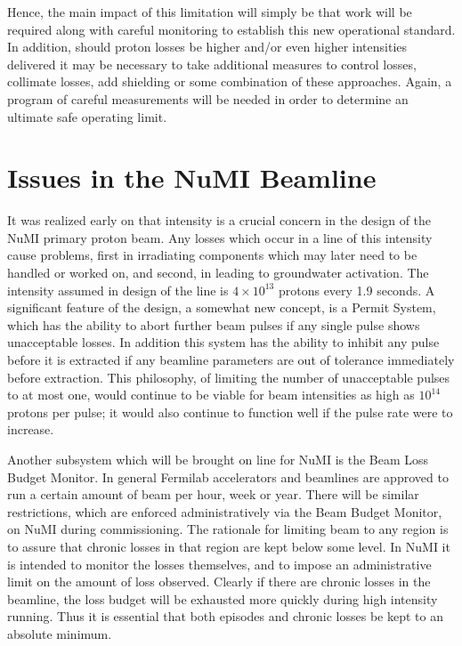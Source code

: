 \documentclass{article}
\begin{document}
Hence, the main impact of this limitation will simply be that 
work will be required along with careful monitoring to establish this new
operational standard. In addition, should proton losses be higher and/or
even higher intensities delivered it may be necessary to take additional
measures to control losses, collimate losses, add shielding or some
combination of these approaches. Again, a program of careful measurements
will be needed in order to determine an ultimate safe operating limit.

\section{Issues in the NuMI Beamline}

It was realized early on that intensity is a crucial concern
in the design 
of the NuMI primary proton beam. Any losses which occur in a line of this 
intensity cause problems, first in irradiating components which may later need 
to be handled or worked on, and second, in leading to groundwater activation. 
The intensity assumed in design of the line is 
$4 \times 10^{13}$ protons every 1.9 
seconds. A significant feature of the design, a somewhat new concept, is a 
Permit System, which has the ability to abort further beam pulses
if any single pulse shows unacceptable losses. 
In addition this system has the ability to inhibit any 
pulse before it is extracted
if any beamline parameters are out of tolerance 
immediately before extraction. This philosophy, of limiting the number of 
unacceptable pulses to at most one, would continue to be viable for beam 
intensities as high as $10^{14}$
 protons per pulse; it would also continue to function 
well if the pulse rate were to increase.

Another subsystem which will be brought on line for NuMI is the Beam Loss 
Budget Monitor. In general Fermilab accelerators and beamlines are approved 
to run a certain amount of beam per hour, week or year. There will be similar 
restrictions, which are enforced administratively via the Beam Budget 
Monitor, on NuMI during commissioning. The rationale for limiting beam to 
any region is to assure that chronic losses in that region are kept below some 
level. In NuMI it is intended to monitor the losses themselves, and to impose 
an administrative limit on the amount of loss observed. Clearly if there are 
chronic losses in the beamline, the loss budget will be exhausted more quickly 
during high intensity running. Thus it is essential that both episodes
and chronic losses be 
kept to an absolute minimum.
\end{document}
